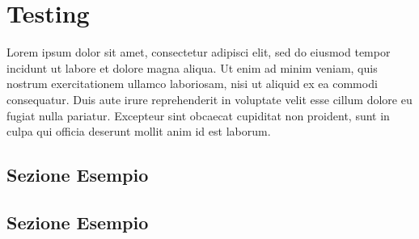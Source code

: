 \chapter{Testing}
\label{chap:Capitolo1}

Lorem ipsum dolor sit amet, consectetur adipisci elit, sed do eiusmod tempor incidunt ut labore et dolore magna aliqua. Ut enim ad minim veniam, quis nostrum exercitationem ullamco laboriosam, nisi ut aliquid ex ea commodi consequatur. Duis aute irure reprehenderit in voluptate velit esse cillum dolore eu fugiat nulla pariatur. Excepteur sint obcaecat cupiditat non proident, sunt in culpa qui officia deserunt mollit anim id est laborum.

\section{Sezione Esempio}
 
 
\section{Sezione Esempio}